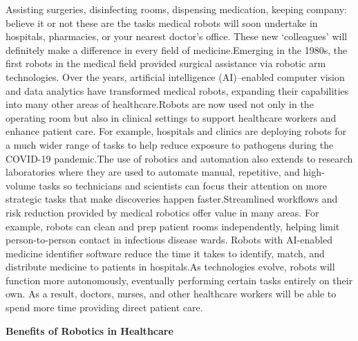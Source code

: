 \documentclass[12pt,a4paper]{report}
\begin{document}
Assisting surgeries, disinfecting rooms, dispensing medication, keeping company: believe it or not these are the tasks medical robots will soon undertake in hospitals, pharmacies, or your nearest doctor’s office. These new ‘colleagues’ will definitely make a difference in every field of medicine.Emerging in the 1980s, the first robots in the medical field provided surgical assistance via robotic arm technologies. Over the years, artificial intelligence (AI)–enabled computer vision and data analytics have transformed medical robots, expanding their capabilities into many other areas of healthcare.Robots are now used not only in the operating room but also in clinical settings to support healthcare workers and enhance patient care. For example, hospitals and clinics are deploying robots for a much wider range of tasks to help reduce exposure to pathogens during the COVID-19 pandemic.The use of robotics and automation also extends to research laboratories where they are used to automate manual, repetitive, and high-volume tasks so technicians and scientists can focus their attention on more strategic tasks that make discoveries happen faster.Streamlined workflows and risk reduction provided by medical robotics offer value in many areas. For example, robots can clean and prep patient rooms independently, helping limit person-to-person contact in infectious disease wards. Robots with AI-enabled medicine identifier software reduce the time it takes to identify, match, and distribute medicine to patients in hospitals.As technologies evolve, robots will function more autonomously, eventually performing certain tasks entirely on their own. As a result, doctors, nurses, and other healthcare workers will be able to spend more time providing direct patient care.
\begin{center}
  \small{\textbf{Benefits of Robotics in Healthcare }}
\end{center}
\end{document}
